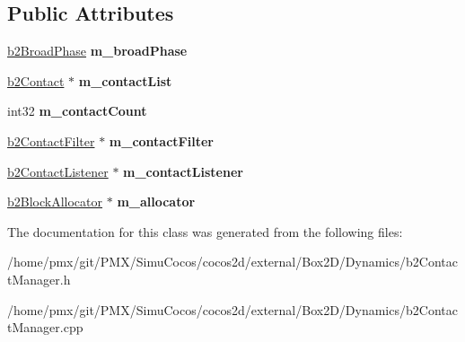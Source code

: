 \subsection*{Public Attributes}
\begin{DoxyCompactItemize}
\item 
\mbox{\label{classb2ContactManager_af85a9c7b0fb138b9fb635dbcf3b0b482}} 
\hyperlink{classb2BroadPhase}{b2\+Broad\+Phase} {\bfseries m\+\_\+broad\+Phase}
\item 
\mbox{\label{classb2ContactManager_a95d6dc3335c39fec8f02dac12eff89b3}} 
\hyperlink{classb2Contact}{b2\+Contact} $\ast$ {\bfseries m\+\_\+contact\+List}
\item 
\mbox{\label{classb2ContactManager_a115b2f9bf38ffd045b26ae91ea696288}} 
int32 {\bfseries m\+\_\+contact\+Count}
\item 
\mbox{\label{classb2ContactManager_a8a46c9e488cdc49ddd8aee3f5eb2adf8}} 
\hyperlink{classb2ContactFilter}{b2\+Contact\+Filter} $\ast$ {\bfseries m\+\_\+contact\+Filter}
\item 
\mbox{\label{classb2ContactManager_ab4e05cd6c62dd35dbbcea01931f916b5}} 
\hyperlink{classb2ContactListener}{b2\+Contact\+Listener} $\ast$ {\bfseries m\+\_\+contact\+Listener}
\item 
\mbox{\label{classb2ContactManager_aeb0d196f1e32816b7f1e122f1743c65d}} 
\hyperlink{classb2BlockAllocator}{b2\+Block\+Allocator} $\ast$ {\bfseries m\+\_\+allocator}
\end{DoxyCompactItemize}


The documentation for this class was generated from the following files\+:\begin{DoxyCompactItemize}
\item 
/home/pmx/git/\+P\+M\+X/\+Simu\+Cocos/cocos2d/external/\+Box2\+D/\+Dynamics/b2\+Contact\+Manager.\+h\item 
/home/pmx/git/\+P\+M\+X/\+Simu\+Cocos/cocos2d/external/\+Box2\+D/\+Dynamics/b2\+Contact\+Manager.\+cpp\end{DoxyCompactItemize}
